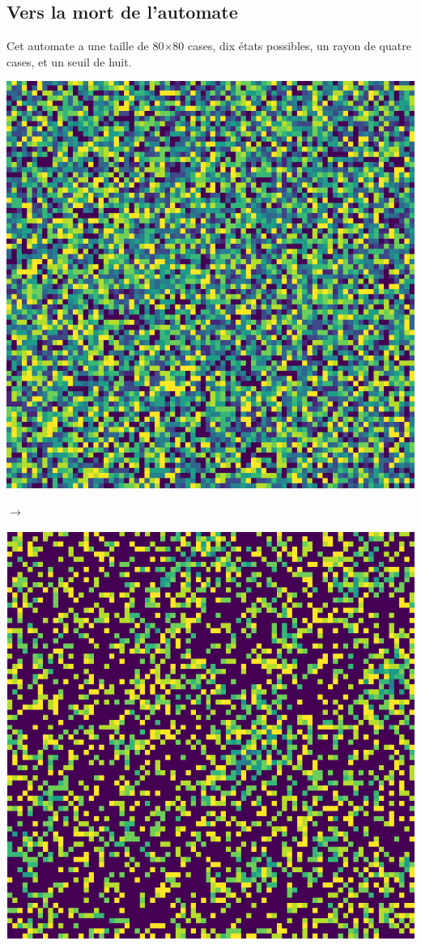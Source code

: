 \documentclass[12pt, a4paper]{article}
\begin{document}
        \subsection{Vers la mort de l'automate}
            Cet automate a une taille de 80$\times$80 cases, dix états possibles, un rayon de quatre cases, et un seuil de huit.
            \begin{center}
                \begin{minipage}{.17\linewidth}
                    \includegraphics[scale=0.15]{img/part3/2/step1.png}
                \end{minipage}
                $\rightarrow$
                \begin{minipage}{.17\linewidth}
                    \includegraphics[scale=0.15]{img/part3/2/step2.png}

\end{minipage}
\end{center}
\end{document}
